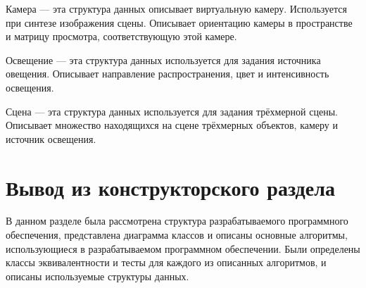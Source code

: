 Камера --- эта структура данных описывает виртуальную камеру. Используется при синтезе изображения сцены. Описывает ориентацию камеры в пространстве и матрицу просмотра, соответствующую этой камере.

Освещение --- эта структура данных используется для задания источника овещения. Описывает направление распространения, цвет и интенсивность освещения.

Сцена --- эта структура данных используется для задания трёхмерной сцены. Описывает множество находящихся на сцене трёхмерных объектов, камеру и источник освещения.

\section{Вывод из конструкторского раздела}
В данном разделе была рассмотрена структура разрабатываемого программного обеспечения, представлена диаграмма классов и описаны основные алгоритмы, использующиеся в разрабатываемом программном обеспечении. Были определены классы эквивалентности и тесты для каждого из описанных алгоритмов, и описаны используемые структуры данных.